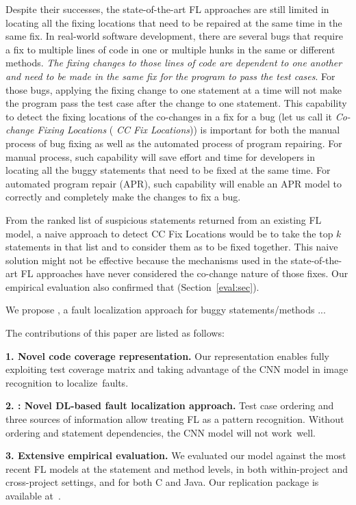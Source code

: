 Despite their successes, the state-of-the-art FL approaches are still
limited in locating all the fixing locations that need to be repaired
at the same time in the same fix. In real-world software development,
there are several bugs that require a fix to multiple lines of code in
one or multiple hunks in the same or different methods. {\em The
  fixing changes to those lines of code are dependent to one another
  and need to be made in the same fix for the program to pass the test
  cases}. For those bugs, applying the fixing change to one statement
at a time will not make the program pass the test case after the
change to one statement.
%
This capability to detect the fixing locations of the co-changes in a
fix for a bug (let us call it {\em Co-change Fixing Locations} ({\em
  CC Fix Locations})) is important for both the manual process of bug
fixing as well as the automated process of program repairing. For
manual process, such capability will save effort and time for
developers in locating all the buggy statements that need to be fixed
at the same time. For automated program repair (APR), such capability
will enable an APR model to correctly and completely make the changes
to fix a bug.

From the ranked list of suspicious statements returned from an
existing FL model, a naive approach to detect CC Fix Locations would
be to take the top $k$ statements in that list and to consider them as
to be fixed together. This naive solution might not be effective
because the mechanisms used in the state-of-the-art FL approaches have
never considered the co-change nature of those fixes. Our empirical
evaluation also confirmed that (Section~\ref{eval:sec}).


We propose {\tool}, a fault localization approach for buggy
statements/methods  ...

The contributions of this paper are listed as follows:

{\bf 1. Novel code coverage representation.} Our representation
enables fully exploiting test coverage matrix and taking advantage of
the CNN model in image recognition to localize~faults.

{\bf 2. {\tool}: Novel DL-based fault localization approach.} Test
case ordering and three sources of information allow treating FL as a
pattern recognition. Without ordering and statement dependencies, the
CNN model will not work~well.

{\bf 3. Extensive empirical evaluation.} We evaluated our model
against the most recent FL models at the statement and method levels,
in both within-project and cross-project settings, and for both C and
Java. Our replication package is available
at~\cite{FaultLocalization2021}.

